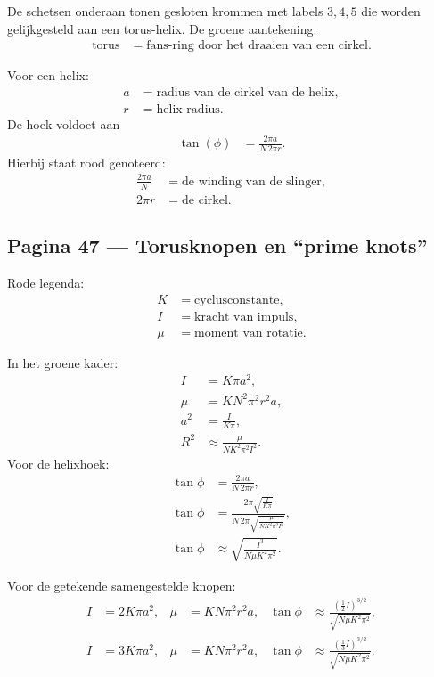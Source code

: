 \documentclass[11pt]{article}
\begin{document}
De schetsen onderaan tonen gesloten krommen met labels $3,4,5$ die worden gelijkgesteld aan een torus-helix. De groene aantekening:
\begin{align*}
\text{torus}
  &= \text{fans-ring door het draaien van een cirkel}.
\end{align*}

Voor een helix:
\begin{align*}
a&=\text{radius van de cirkel van de helix},\\
r&=\text{helix-radius}.
\end{align*}
De hoek voldoet aan
\begin{align*}
\tan(\phi)
  &=
  \frac{2\pi a}{N\,2\pi r}.
\end{align*}
Hierbij staat rood genoteerd:
\begin{align*}
\frac{2\pi a}{N}
  &= \text{de winding van de slinger},\\
2\pi r
  &= \text{de cirkel}.
\end{align*}

\subsection*{Pagina 47 --- Torusknopen en ``prime knots''}

Rode legenda:
\begin{align*}
K &= \text{cyclusconstante},\\
I &= \text{kracht van impuls},\\
\mu &= \text{moment van rotatie}.
\end{align*}

In het groene kader:
\begin{align*}
I &= K\pi a^2,\\
\mu &= K N^2\pi^2 r^2 a,\\
a^2 &= \frac{I}{K\pi},\\
R^2 &\approx \frac{\mu}{N K^2 \pi^2 I^2}.
\end{align*}
Voor de helixhoek:
\begin{align*}
\tan\phi
  &= \frac{2\pi a}{N\,2\pi r},\\
\tan\phi
  &=
  \frac{2\pi \sqrt{\frac{I}{K\pi}}}
       {N\,2\pi
        \sqrt{\frac{\mu}{N K^2 \pi^2 I^2}}},\\
\tan\phi
  &\approx
  \sqrt{
      \frac{I^3}{N\mu K^2\pi^2}
  }.
\end{align*}

Voor de getekende samengestelde knopen:
\begin{align*}
I &= 2K\pi a^2,
&
\mu &= K N \pi^2 r^2 a,
&
\tan\phi &\approx
\frac{\left(\frac{1}{2}I\right)^{3/2}}
{\sqrt{N\mu K^2\pi^2}},\\
I &= 3K\pi a^2,
&
\mu &= K N \pi^2 r^2 a,
&
\tan\phi &\approx
\frac{\left(\frac{1}{3}I\right)^{3/2}}
{\sqrt{N\mu K^2\pi^2}}.
\end{align*}
\end{document}
